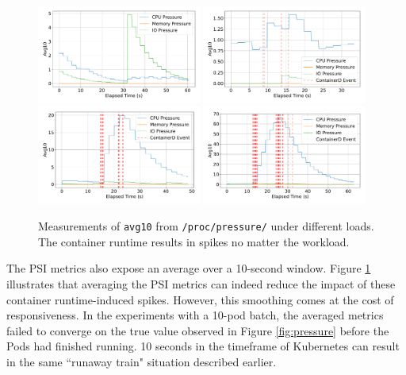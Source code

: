 \begin{figure}[ht]
    \centering
    \includegraphics[width=0.48\textwidth]{images/avg-pressure-baseline.pdf}
    \includegraphics[width=0.48\textwidth]{images/avg-pressure-single.pdf} \\
    \includegraphics[width=0.48\textwidth]{images/avg-pressure-smallbatch.pdf}
    \includegraphics[width=0.48\textwidth]{images/avg-pressure-bigbatch.pdf}
    \caption{Measurements of \texttt{avg10} from \texttt{/proc/pressure/} under
    different loads. The container runtime results in spikes no matter the
    workload.} \label{fig:pressure-avg}
\end{figure}
The PSI metrics also expose an average over a 10-second window. Figure
\ref{fig:pressure-avg} illustrates that averaging the PSI metrics can indeed
reduce the impact of these container runtime-induced spikes. However, this
smoothing comes at the cost of responsiveness. In the experiments with a 10-pod
batch, the averaged metrics failed to converge on the true value observed in
Figure \ref{fig:pressure} before the Pods had finished running. 10 seconds in
the timeframe of Kubernetes can result in the same ``runaway train" situation
described earlier.

